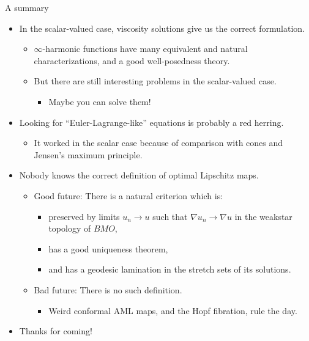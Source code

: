 \documentclass[10pt]{beamer}
\begin{document}
\begin{frame}{A summary}
\begin{itemize}
\item In the scalar-valued case, viscosity solutions give us the correct formulation.
\begin{itemize}
\item $\infty$-harmonic functions have many equivalent and natural characterizations, and a good well-posedness theory.
\item But there are still interesting problems in the scalar-valued case.
\begin{itemize}
\item Maybe you can solve them! \pause
\end{itemize}
\end{itemize}
\item Looking for ``Euler-Lagrange-like'' equations is probably a red herring.
\begin{itemize}
\item It worked in the scalar case because of comparison with cones and Jensen's maximum principle. \pause
\end{itemize}
\item Nobody knows the correct definition of optimal Lipschitz maps.
\begin{itemize}
    \item Good future: There is a natural criterion which is:
    \begin{itemize}
    \item preserved by limits $u_n \to u$ such that $\nabla u_n \to \nabla u$ in the weakstar topology of $BMO$,
    \item has a good uniqueness theorem,
    \item and has a geodesic lamination in the stretch sets of its solutions.
    \end{itemize}
    \item Bad future: There is no such definition.
    \begin{itemize}
    \item Weird conformal AML maps, and the Hopf fibration, rule the day. \pause
    \end{itemize}
\end{itemize}
\item Thanks for coming!
\end{itemize}
\end{frame}
\end{document}
